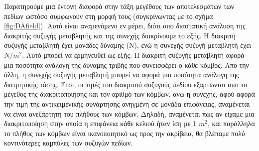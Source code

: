 \newpage

Παρατηρούμε μια έντονη διαφορά στην τάξη μεγέθους των αποτελεσμάτων των πεδίων ωστόσο συμφωνούν στη μορφή τους (συγκρίνωντας με το σχήμα \ref{fig:DAfield}). Αυτό είναι αναμενόμενο εν μέρει, διότι απο διαστατική ανάλυση της διακριτής συζυγής μεταβλητής και της συνεχής διακρίνουμε το εξής. Η διακριτή συζυγής μεταβλητή έχει μονάδες δύναμης (Ν), ενώ η συνεχής συζυγή μεταβλητή έχει $N/m^2$. Αυτό μπορεί να ερμηνευθεί ως εξής. Η διακριτή συζυγής μεταβλητή αφορά μια ποσότητα ανάλογη της δύναμης τριβής που συνεισφέρει ο κάθε κόμβος. Απο την άλλη, η συνεχής συζυγής μεταβλητή μπορεί να αφορά μια ποσότητα ανάλογη της διατμητικής τάσης. Έτσι, οι τιμές του διακριτού συζυγούς πεδίου εξαρτώνται απο το μέγεθος της διακριτοποίησης και τον αριθμό των κόμβων, ανώ η συνεχής, αφού αφορά την τιμή της αντικειμενικής συνάρτησης ανηγμένη σε μονάδα επιφάνειας, αναμένεται να είναι ανεξάρτητη του πλήθους των κόμβων. Δηλαδή, αναμένεται πως αν είχαμε μια διακριτοποίηση στην οποία η επιφάνεια κάθε κελιού ήταν ίση με 1 $m^2$, και παράλληλα το πλήθος των κόμβων είναι ικανοποιητικό ως προς την ακρίβεια, θα βλέπαμε πολύ κοντινότερες καμπύλες των συζυγών πεδίων.  




